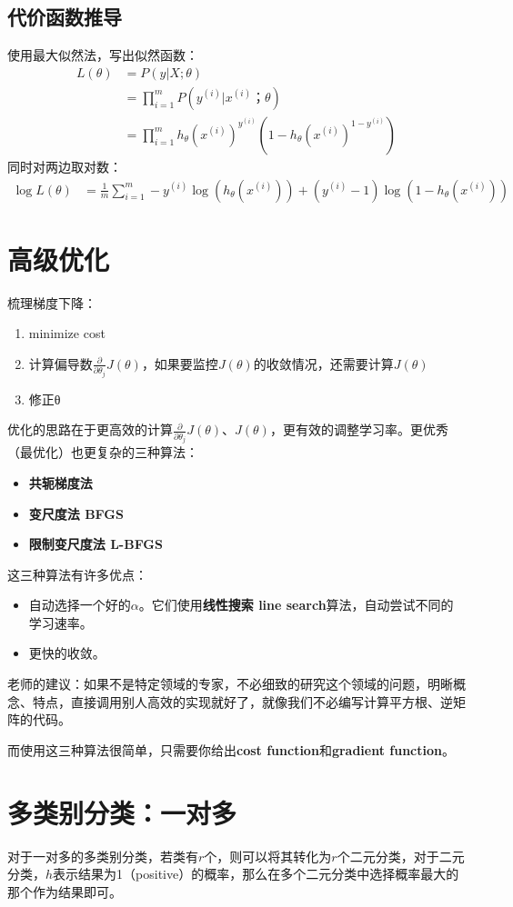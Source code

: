 \documentclass[../main.tex]{subfiles}
\begin{document}
\subsection{代价函数推导}

使用最大似然法，写出似然函数：\begin{align*}
    L(θ) & = P(y|X; θ)                                                                  \\
         & = \prod\limits_{i=1}^{m}P(y^{(i)}|x^{(i)}；θ)                                \\
         & = \prod\limits_{i=1}^{m}h_θ(x^{(i)})^{y^{(i)}} (1-h_θ(x^{(i)})^{1- y^{(i)}})
\end{align*}
同时对两边取对数：
\begin{align*}
    \log L(θ) & = \frac{1}{m}\sum\limits_{i=1}^{m}-y^{(i)}\log(h_θ(x^{(i)})) + (y^{(i)}-1)\log(1- h_θ(x^{(i)}))
\end{align*}

\section{高级优化}
梳理梯度下降：
\begin{enumerate}
    \item minimize cost
    \item 计算偏导数\(\frac{∂}{∂θ_j}J(θ)\)，如果要监控\(J(θ)\)的收敛情况，还需要计算\(J(θ)\)
    \item 修正θ
\end{enumerate}
优化的思路在于更高效的计算\(\frac{∂}{∂θ_j}J(θ)\)、\(J(θ)\)，更有效的调整学习率。更优秀（最优化）也更复杂的三种算法：
\begin{itemize}
    \item \textbf{共轭梯度法}
    \item \textbf{变尺度法 BFGS}
    \item \textbf{限制变尺度法 L-BFGS}
\end{itemize}
这三种算法有许多优点：
\begin{itemize}
    \item 自动选择一个好的\(α\)。它们使用\textbf{线性搜索 line search}算法，自动尝试不同的学习速率。
    \item 更快的收敛。
\end{itemize}
老师的建议：如果不是特定领域的专家，不必细致的研究这个领域的问题，明晰概念、特点，直接调用别人高效的实现就好了，就像我们不必编写计算平方根、逆矩阵的代码。


而使用这三种算法很简单，只需要你给出\textbf{cost function}和\textbf{gradient function}。

\section{多类别分类：一对多}
对于一对多的多类别分类，若类有\(r\)个，则可以将其转化为\(r\)个二元分类，对于二元分类，\(h\)表示结果为1（positive）的概率，那么在多个二元分类中选择概率最大的那个作为结果即可。
\end{document}
